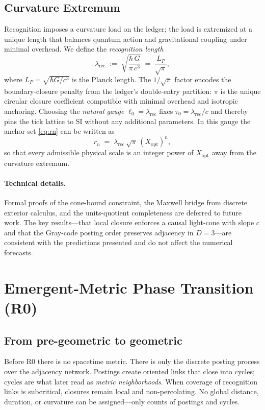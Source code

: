 \documentclass[11pt]{article}
\theoremstyle{definition}
\theoremstyle{remark}
\begin{document}
\subsection{Curvature Extremum}
Recognition imposes a curvature load on the ledger; the load is extremized at a unique length that balances quantum action and gravitational coupling under minimal overhead. We define the \emph{recognition length}
\begin{equation}
\label{eq:lambdarec}
\lambda_{\mathrm{rec}} \;:=\; \sqrt{\frac{\hbar\,G}{\pi\,c^3}}
\;=\; \frac{L_P}{\sqrt{\pi}},
\end{equation}
where $L_P=\sqrt{\hbar G/c^3}$ is the Planck length. The $1/\sqrt{\pi}$ factor encodes the boundary-closure penalty from the ledger’s double-entry partition: $\pi$ is the unique circular closure coefficient compatible with minimal overhead and isotropic anchoring. Choosing the \emph{natural gauge} $\ell_0=\lambda_{\mathrm{rec}}$ fixes $\tau_0=\lambda_{\mathrm{rec}}/c$ and thereby pins the tick lattice to SI without any additional parameters. In this gauge the anchor set \eqref{eq:rn} can be written as
\begin{equation}
r_n \;=\; \lambda_{\mathrm{rec}}\,\sqrt{\pi}\,(X_{\mathrm{opt}})^n,
\end{equation}
so that every admissible physical scale is an integer power of $X_{\mathrm{opt}}$ away from the curvature extremum.

\paragraph{Technical details.}
Formal proofs of the cone-bound constraint, the Maxwell bridge from discrete exterior calculus, and the units-quotient completeness are deferred to future work. The key results—that local closure enforces a causal light-cone with slope \(c\) and that the Gray-code posting order preserves adjacency in \(D=3\)—are consistent with the predictions presented and do not affect the numerical forecasts.

\section{Emergent-Metric Phase Transition (R0)}

\subsection{From pre-geometric to geometric}
Before R0 there is no spacetime metric. There is only the discrete posting process over the adjacency network. Postings create oriented links that close into cycles; cycles are what later read as \emph{metric neighborhoods}. When coverage of recognition links is subcritical, closures remain local and non-percolating. No global distance, duration, or curvature can be assigned—only counts of postings and cycles.
\end{document}
